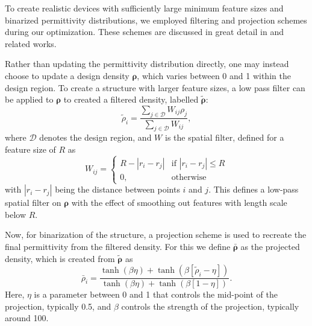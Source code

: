 To create realistic devices with sufficiently large minimum feature sizes and binarized permittivity distributions, we employed filtering and projection schemes during our optimization.  These schemes are discussed in great detail in \cite{zhou2015minimum} and related works.  

Rather than updating the permittivity distribution directly, one may instead choose to update a design density $\bm{\rho}$, which varies between 0 and 1 within the design region.  To create a structure with larger feature sizes, a low pass filter can be applied to $\bm{\rho}$ to created a filtered density, labelled $\tilde{\bm{\rho}}$:
%
\begin{equation}
\tilde{\rho}_i = \frac{\sum_{j\in \mathcal{D}} W_{ij} \rho_j}{\sum_{j\in \mathcal{D}} W_{ij}},
\end{equation}
%
where $\mathcal{D}$ denotes the design region, and $W$ is the spatial filter, defined for a feature size of $R$ as 
\begin{equation}
  W_{ij} = 
  \begin{cases}
    R - | r_{i} - r_{j} | & \text{if }  | r_{i} - r_{j} | \leq R \\
    0, & \text{otherwise } 
  \end{cases}
\end{equation}
with $|r_{i} - r_{j}|$ being the distance between points $i$ and $j$.  This defines a low-pass spatial filter on $\bm{\rho}$ with the effect of smoothing out features with length scale below $R$.


Now, for binarization of the structure, a projection scheme is used to recreate the final permittivity from the filtered density.  For this we define $\bar{\bm{\rho}}$ as the projected density, which is created from $\tilde{\bm{\rho}}$ as
\begin{equation}
\bar{\rho}_i = \frac{\tanh{\left( \beta \eta \right)} + \tanh{\left( \beta \left[ \tilde{\rho}_i - \eta \right] \right)}}{\tanh{\left( \beta \eta  \right)} + \tanh{\left( \beta \left[ 1 - \eta \right] \right)}}.
\end{equation}
Here, $\eta$ is a parameter between 0 and 1 that controls the mid-point of the projection, typically 0.5, and $\beta$ controls the strength of the projection, typically around 100.

% 
% 


